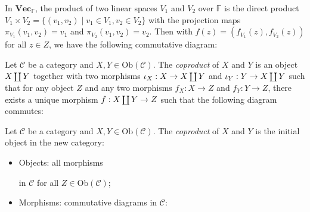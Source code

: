 \documentclass[
	11pt, %
	fleqn, %
	a4paper, %
]{LegrandOrangeBook}
\newcommand{\F}{\mathbb{F}} %
\newcommand{\C}{\mathcal{C}} %
\newcommand{\Vect}{\textbf{Vec}} %
\newcommand{\Ob}[1]{\text{Ob}(#1)} %
\DeclareRobustCommand{\coprod}{\mathop{\text{\fakecoprod}}}
\newcommand{\fakecoprod}{%
    \sbox0{$\prod$}%
    \smash{\raisebox{\dimexpr.9625\depth-\dp0}{\scalebox{1}[-1]{$\prod$}}}%
    \vphantom{$\prod$}%
}
\begin{document}
\begin{example}
    In $\Vect_{\F}$, the product of two linear spaces $V_1$ and $V_2$ over $\F$ is the direct product $V_1 \times V_2 = \{ (v_1, v_2) \mid v_1 \in V_1, v_2 \in V_2 \}$ with the projection maps $\pi_{V_1}(v_1, v_2) = v_1$ and $\pi_{V_2}(v_1, v_2) = v_2$. Then with $f(z) = (f_{V_1}(z), f_{V_2}(z))$ for all $z \in Z$, we have the following commutative diagram:
    \begin{center}
    \end{center}
\end{example}

\begin{definition}[Coproducts]
    Let $\C$ be a category and $X, Y \in \Ob{\C}$. The \emph{coproduct} of $X$ and $Y$ is an object $X \coprod Y$ together with two morphisms $\iota_X : X \to X \coprod Y$ and $\iota_Y : Y \to X \coprod Y$ such that for any object $Z$ and any two morphisms $f_X : X \to Z$ and $f_Y : Y \to Z$, there exists a unique morphism $f : X \coprod Y \to Z$ such that the following diagram commutes:
    \begin{center}
    \end{center}
\end{definition}

\begin{corollary}
    Let $\C$ be a category and $X, Y \in \Ob{\C}$. The \emph{coproduct} of $X$ and $Y$ is the initial object in the new category:
    \begin{itemize}
        \item Objects: all morphisms  in $\C$ for all $Z \in \Ob{\C}$;
        \item Morphisms: commutative diagrams in $\C$:
    \end{itemize}
    \begin{center}
    \end{center}
\end{corollary}
\end{document}
